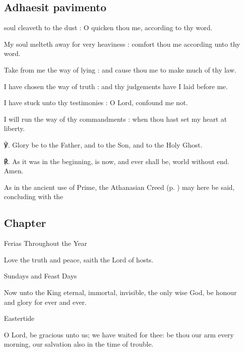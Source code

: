 \begin{multicols}{2}
\subsection{Adhaesit pavimento}
 soul cleaveth to the dust : O quicken thou me, according to thy word.\par
{}
My soul melteth away for very heaviness : comfort thou me according unto thy word.\par
{}Take from me the way of lying : and cause thou me to make much of thy law.\par
{}I have chosen the way of truth : and thy judgements have I laid before me.\par
{}I have stuck unto thy testimonies : O Lord, confound me not.\par
{}I will run the way of thy commandments : when thou hast set my heart at liberty.\par
℣. Glory be to the Father, and to the Son, and to the Holy Ghost.\par
℟. As it was in the beginning, is now, and ever shall be, world without end. Amen.

\begin{rubric}
    As in the ancient use of Prime, the Athanasian Creed (p. \pageref{Ath}) may here be said, concluding with the 
\end{rubric}

\subsection{Chapter}

\begin{inhead}
	Ferias Throughout the Year
\end{inhead}\par\noindent
Love the truth and peace, saith the Lord of hosts.

\begin{inhead}
	Sundays and Feast Days
\end{inhead}\par\noindent
Now unto the King eternal, immortal, invisible, the only wise God, be honour and glory for ever and ever.

\begin{inhead}
	Eastertide
\end{inhead}\par\noindent
O Lord, be gracious unto us; we have waited for thee: be thou our arm every morning, our salvation also in the time of trouble.


\end{multicols}

